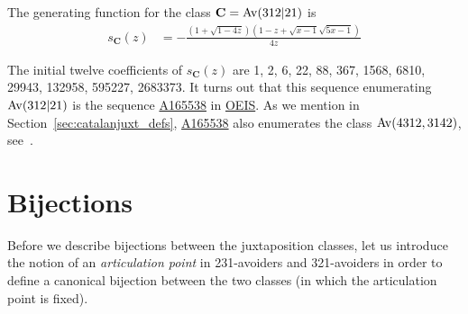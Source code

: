 \begin{theorem}
The generating function for the class $\mathbf{C} = \mathrm{Av}(312|21)$ is
\begin{align*}
s_{\mathbf{C}}(z) &= -\frac{(1+\sqrt{1-4z})(1-z+\sqrt{x-1}\sqrt{5x-1})}{4z}
\end{align*}
\end{theorem}

The initial twelve coefficients of $s_{\mathbf{C}}(z)$ are 1, 2, 6, 22, 88, 367, 1568, 6810, 29943, 132958, 595227, 2683373. It turns out that this sequence enumerating $\mathrm{Av}(312|21)$ is the sequence \href{http://oeis.org/A165538}{A165538} in \href{http://oeis.org/}{OEIS}. As we mention in Section~\ref{sec:catalanjuxt_defs}, \href{http://oeis.org/A165538}{A165538} also enumerates the class $\mathrm{Av}(4312,3142)$, see~\cite{albert2012inflations}.

\section{Bijections}
\label{sec:bijections}
Before we describe bijections between the juxtaposition classes, let us introduce the notion of an \emph{articulation point} in 231-avoiders and 321-avoiders in order to define a canonical bijection between the two classes (in which the articulation point is fixed).

